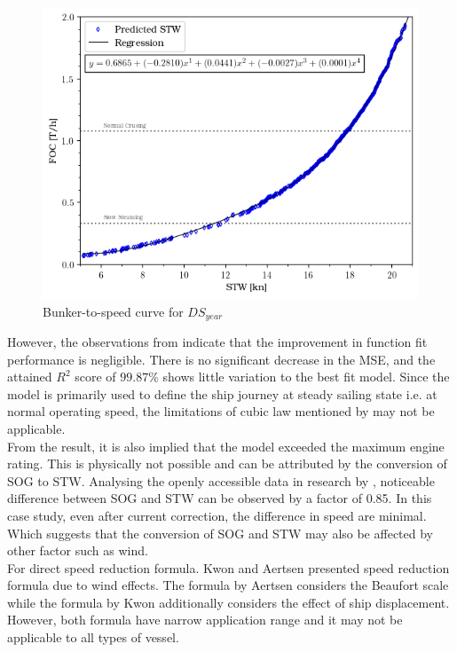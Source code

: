 \begin{figure}
    \centering
    \includegraphics[width=.7\linewidth]{02_figures/FOC_plot_act_yr.png}
    \caption{Bunker-to-speed curve for $DS_{year}$}
    \label{fig:FOC_plot_act_yr}
\end{figure}

However, the observations from  indicate that the improvement in function fit performance is negligible. There is no significant decrease in the MSE, and the attained $R^2$ score of $99.87\%$ shows little variation to the best fit model. Since the model is primarily used to define the ship journey at steady sailing state i.e. at normal operating speed, the limitations of cubic law mentioned by  may not be applicable.\\

From the result, it is also implied that the model exceeded the maximum engine rating. This is physically not possible and can be attributed by the conversion of SOG to STW. Analysing the openly accessible data in research by , noticeable difference between SOG and STW can be observed by a factor of 0.85. In this case study, even after current correction, the difference in speed are minimal. Which suggests that the conversion of SOG and STW may also be affected by other factor such as wind.\\

For direct speed reduction formula. Kwon and Aertsen presented speed reduction formula due to wind effects. The formula by Aertsen considers the Beaufort scale while the formula by Kwon additionally considers the effect of ship displacement. However, both formula have narrow application range and it may not be applicable to all types of vessel.\\ 



